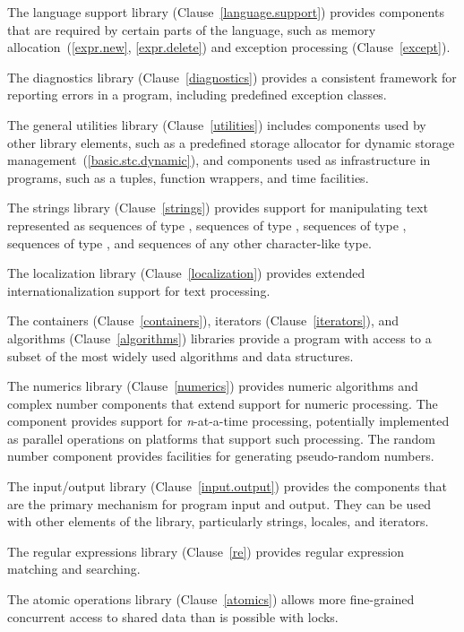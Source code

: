 \pnum
The language support library (Clause~\ref{language.support}) provides components that are
required by certain parts of the \Cpp language, such as memory allocation~(\ref{expr.new},
\ref{expr.delete}) and exception processing (Clause~\ref{except}).

\pnum
The diagnostics library (Clause~\ref{diagnostics}) provides a consistent framework for
reporting errors in a \Cpp program, including predefined exception classes.

\pnum
The general utilities library (Clause~\ref{utilities}) includes components used
by other library elements, such as a predefined storage allocator for dynamic
storage management~(\ref{basic.stc.dynamic}), and components used
as infrastructure
in \Cpp programs,
such as a tuples, function wrappers, and time facilities.

\pnum
The strings library (Clause~\ref{strings}) provides support for manipulating text represented 
as sequences of type
,
sequences of type
,
sequences of type
,
sequences of type
,
and sequences of any other character-like type.

\pnum
The localization library (Clause~\ref{localization}) provides extended internationalization
support for text processing.

\pnum
The containers (Clause~\ref{containers}), iterators (Clause~\ref{iterators}),
and algorithms (Clause~\ref{algorithms}) libraries provide a \Cpp program with access
to a subset of the most widely used algorithms and data structures.

\pnum
The numerics library (Clause~\ref{numerics}) provides
numeric algorithms and complex number components that extend support for numeric processing.
The
component provides support for
\textit{n}-at-a-time
processing,
potentially implemented as parallel operations on platforms that support such processing.
The random number component provides facilities for generating pseudo-random numbers.

\pnum
The input/output library (Clause~\ref{input.output}) provides the
components that are the primary mechanism for \Cpp program input and output.
They can be used with other elements of the library, particularly
strings, locales, and iterators.

\pnum
The regular expressions library (Clause~\ref{re}) provides regular expression matching and searching.

\pnum
The atomic operations library (Clause~\ref{atomics}) allows more fine-grained
concurrent access to shared data than is possible with locks.

